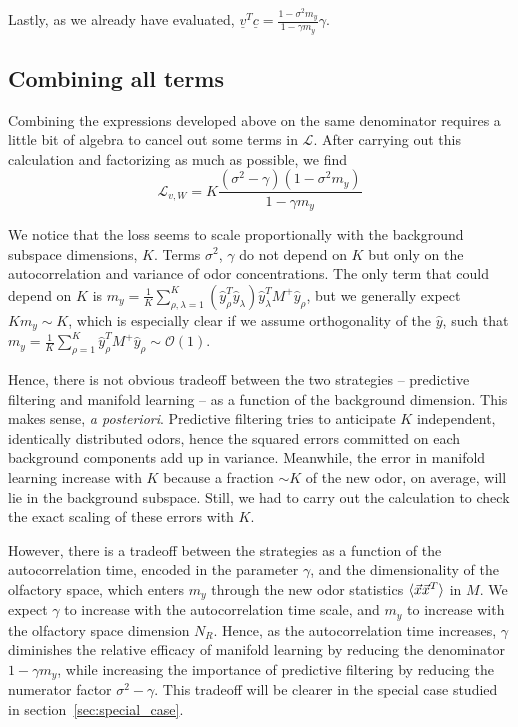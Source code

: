 \documentclass[letter, 12pt]{article}
\def\beq{ \begin{equation} }		%
\def\eeq{ \end{equation} } 			%
\begin{document}
Lastly, as we already have evaluated, $\underline{v}^T \underline{c} = \frac{1 - \sigma^2 m_y}{1 - \gamma m_y} \gamma$. 


\subsection{Combining all terms}
Combining the expressions developed above on the same denominator requires a little bit of algebra to cancel out some terms in $\mathcal{L}$. After carrying out this calculation and factorizing as much as possible, we find
\beq
	\mathcal{L}_{v, W} = K \frac{(\sigma^2 - \gamma) (1 - \sigma^2 m_y)}{1 - \gamma m_y}
	\label{eq:loss_evaluated_general}
\eeq

We notice that the loss seems to scale proportionally with the background subspace dimensions, $K$. Terms $\sigma^2$, $\gamma$ do not depend on $K$ but only on the autocorrelation and variance of odor concentrations. The only term that could depend on $K$ is $m_y = \frac{1}{K} \sum_{\rho, \lambda=1}^K (\hat{y}_{\rho}^T \hat{y}_{\lambda}) \hat{y}_{\lambda}^T M^+ \hat{y}_{\rho}$, but we generally expect $K m_y \sim K$, which is especially clear if we assume orthogonality of the $\hat{y}$, such that $m_y = \frac{1}{K} \sum_{\rho=1}^K  \hat{y}_{\rho}^T M^+ \hat{y}_{\rho} \sim \mathcal{O}(1)$. 

Hence, there is not obvious tradeoff between the two strategies -- predictive filtering and manifold learning -- as a function of the background dimension. This makes sense, \textit{a posteriori}. Predictive filtering tries to anticipate $K$ independent, identically distributed odors, hence the squared errors committed on each background components add up in variance. Meanwhile, the error in manifold learning increase with $K$ because a fraction $\sim K$ of the new odor, on average, will lie in the background subspace. Still, we had to carry out the calculation to check the exact scaling of these errors with $K$. 

However, there is a tradeoff between the strategies as a function of the autocorrelation time, encoded in the parameter $\gamma$, and the dimensionality of the olfactory space, which enters $m_y$ through the new odor statistics $\braket{\vec{x} \vec{x}^T}$ in $M$. We expect $\gamma$ to increase with the autocorrelation time scale, and $m_y$ to increase with the olfactory space dimension $N_R$. Hence, as the autocorrelation time increases, $\gamma$ diminishes the relative efficacy of manifold learning by reducing the denominator $1 - \gamma m_y$, while increasing the importance of predictive filtering by reducing the numerator factor $\sigma^2 - \gamma$. This tradeoff will be clearer in the special case studied in section~\ref{sec:special_case}. 
\end{document}
